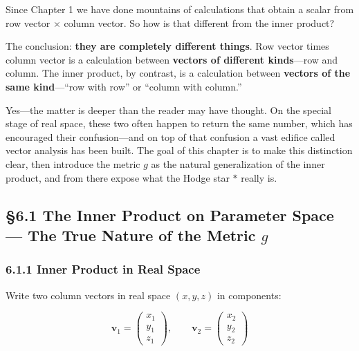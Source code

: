 \documentclass[a4paper,12pt,openany]{book}
\begin{document}
Since Chapter 1 we have done mountains of calculations that obtain a
scalar from row vector × column vector. So how is that different from
the inner product?

The conclusion: \textbf{they are completely different things}. Row
vector times column vector is a calculation between
\textbf{vectors of different kinds}—row and column. The inner product,
by contrast, is a calculation between
\textbf{vectors of the same kind}—``row with row'' or ``column with
column.''

Yes—the matter is deeper than the reader may have thought. On the
special stage of real space, these two often happen to return the same
number, which has encouraged their confusion—and on top of that
confusion a vast edifice called vector analysis has been built. The goal
of this chapter is to make this distinction clear, then introduce the
metric \(g\) as the natural generalization of the inner product, and
from there expose what the Hodge star \(\ast\) really is.

\par\vspace{0.35em}\par

\hypertarget{the-inner-product-on-parameter-space-the-true-nature-of-the-metric-g}{%
\subsection{\texorpdfstring{§6.1 The Inner Product on Parameter Space
— The True Nature of the Metric
\(g\)}{§6.1 The Inner Product on Parameter Space — The True Nature of the Metric g}}\label{the-inner-product-on-parameter-space-the-true-nature-of-the-metric-g}}

\hypertarget{inner-product-in-real-space}{%
\subsubsection{6.1.1 Inner Product in Real
Space}\label{inner-product-in-real-space}}

Write two column vectors in real space \((x,y,z)\) in components:

\[\mathbf{v}_1 = \begin{pmatrix} x_1 \\ y_1 \\ z_1 \end{pmatrix},\qquad \mathbf{v}_2 = \begin{pmatrix} x_2 \\ y_2 \\ z_2 \end{pmatrix}\]
\end{document}
